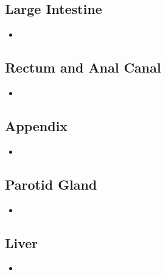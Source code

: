 \begin{itemize}
  \subsection{Large Intestine}\label{Large Intestine}
  \begin{multicols}{2}
  \begin{itemize}
    \item 
  \end{itemize}
  \end{multicols}

  \subsection{Rectum and Anal Canal}\label{Rectum and Anal Canal}
  \begin{multicols}{2}
  \begin{itemize}
    \item 
  \end{itemize}
  \end{multicols}
  
  \subsection{Appendix}\label{Appendix}
  \begin{multicols}{2}
  \begin{itemize}
    \item 
  \end{itemize}
  \end{multicols}

  \subsection{Parotid Gland}\label{Parotid Gland}
  \begin{multicols}{2}
  \begin{itemize}
    \item 
  \end{itemize}
  \end{multicols}
  
  \subsection{Liver}\label{Liver}
  \begin{multicols}{2}
  \begin{itemize}
    \item 
  \end{itemize}
  \end{multicols}
  

\end{itemize}
